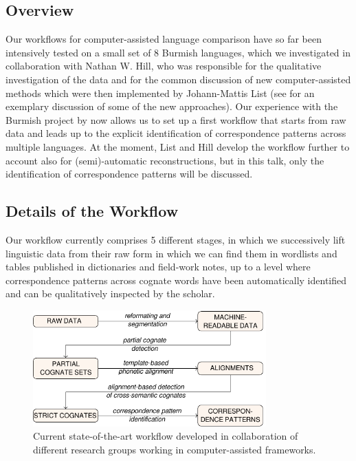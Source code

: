 \documentclass[xetex,svgnames]{scrartcl}
\begin{document}
\subsection{Overview}
Our workflows for computer-assisted language comparison have so far been intensively tested on a
small set of 8 Burmish languages, which we investigated in collaboration with Nathan W. Hill, who
was responsible for the qualitative investigation of the data and for the common discussion of new
computer-assisted methods which were then implemented by Johann-Mattis List (see \citealt{Hill2017a}
for an exemplary discussion of some of the new approaches). Our experience with the
Burmish project by now allows us to set up a first workflow that starts from raw data and leads up
to the explicit identification of correspondence patterns across multiple languages. At the moment,
List and Hill develop the workflow further to account also for (semi)-automatic reconstructions, but
in this talk, only the identification of correspondence patterns will be discussed.

\subsection{Details of the Workflow}

Our workflow currently comprises 5 different stages, in which we successively lift linguistic data
from their raw form in which we can find them in wordlists and tables published in dictionaries and
field-work notes, up to a level where correspondence patterns across cognate words have been
automatically identified and can be qualitatively inspected by the scholar.

\begin{figure}[htb]
  \centering
  \includegraphics[width=0.8\textwidth]{calc-workflow.pdf}
  \caption{Current state-of-the-art workflow developed in collaboration of different research groups
  working in computer-assisted frameworks.}
  \label{fig:workflow}
\end{figure}
\end{document}
